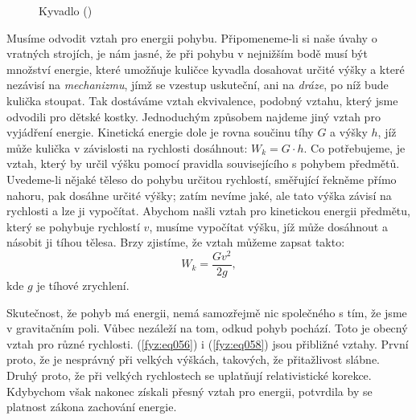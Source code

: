     \begin{figure}[ht!] %
      \centering
      \caption{Kyvadlo (\cite[s.~56]{Feynman01})}
      \label{fyz:fig054}
    \end{figure}
    Musíme odvodit vztah pro energii pohybu. Připomeneme-li si naše úvahy o vratných strojích, je 
    nám jasné, že při pohybu v nejnižším bodě musí být množství energie, které umožňuje kuličce 
    kyvadla dosahovat určité výšky a které nezávisí na \emph{mechanizmu}, jímž se vzestup 
    uskuteční, ani na \emph{dráze}, po níž bude kulička stoupat. Tak dostáváme vztah ekvivalence, 
    podobný vztahu, který jsme odvodili pro dětské kostky. Jednoduchým způsobem najdeme jiný vztah 
    pro vyjádření energie. Kinetická energie dole je rovna součinu tíhy \(G\) a výšky \(h\), jíž 
    může kulička v závislosti na rychlosti dosáhnout: \(W_k=G\cdot h\). Co potřebujeme, je vztah, 
    který by určil výšku pomocí pravidla souvisejícího s pohybem předmětů. Uvedeme-li nějaké těleso 
    do pohybu určitou rychlostí, směřující řekněme přímo nahoru, pak dosáhne určité výšky; zatím 
    nevíme jaké, ale tato výška závisí na rychlosti a lze ji vypočítat. Abychom našli vztah pro 
    kinetickou energii předmětu, který se pohybuje rychlostí \(v\), musíme vypočítat výšku, jíž 
    může dosáhnout a násobit ji tíhou tělesa. Brzy zjistíme, že vztah můžeme zapsat takto:
    \begin{equation}\label{fyz:eq058}
      W_k = \frac{Gv^2}{2g},
    \end{equation}
    kde \(g\) je tíhové zrychlení.
    
    Skutečnost, že pohyb má energii, nemá samozřejmě nic společného s tím, že jsme v gravitačním 
    poli. Vůbec nezáleží na tom, odkud pohyb pochází. Toto je obecný vztah pro různé rychlosti. 
    (\ref{fyz:eq056}) i (\ref{fyz:eq058}) jsou přibližné vztahy. První proto, že je nesprávný při 
    velkých výškách, takových, že přitažlivost slábne. Druhý proto, že při velkých rychlostech se 
    uplatňují relativistické korekce. Kdybychom však nakonec získali přesný vztah pro energii, 
    potvrdila by se platnost zákona zachování energie.

